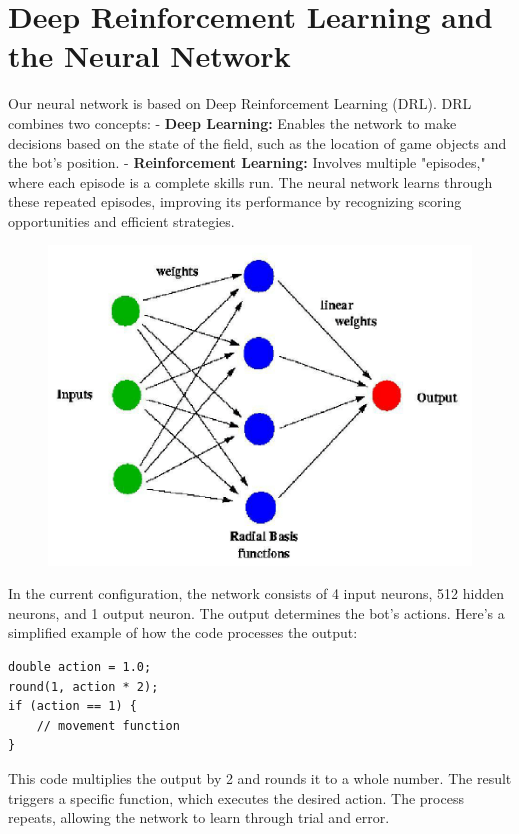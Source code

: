 \section*{Deep Reinforcement Learning and the Neural Network}
Our neural network is based on Deep Reinforcement Learning (DRL). DRL combines two concepts:  
- \textbf{Deep Learning:} Enables the network to make decisions based on the state of the field, such as the location of game objects and the bot’s position.  
- \textbf{Reinforcement Learning:} Involves multiple "episodes," where each episode is a complete skills run. The neural network learns through these repeated episodes, improving its performance by recognizing scoring opportunities and efficient strategies.

\begin{figure}
    \includegraphics[width=0.9\linewidth]{images/neuralexample}
    \label{Fig:neuralexample}
\end{figure}

In the current configuration, the network consists of 4 input neurons, 512 hidden neurons, and 1 output neuron. The output determines the bot's actions. Here’s a simplified example of how the code processes the output:

\begin{verbatim}
double action = 1.0;
round(1, action * 2);
if (action == 1) {
    // movement function
}
\end{verbatim}

This code multiplies the output by 2 and rounds it to a whole number. The result triggers a specific function, which executes the desired action. The process repeats, allowing the network to learn through trial and error.

